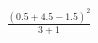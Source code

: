 \documentclass[preview]{standalone}
\begin{document}
\begin{align*}
\frac{(0.5 + 4.5 - 1.5)^2}{3 + 1}
\end{align*}
\end{document}
